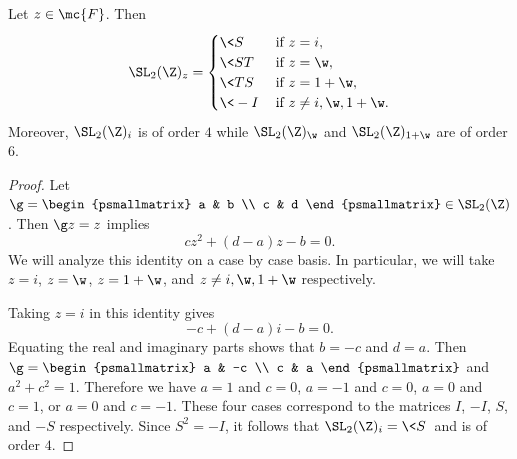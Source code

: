 \documentclass[12pt]{article}
\begin{document}
      \begin{proposition}\label{prop:stabilizer_subgroup}
        Let \(z \in \mc{F}\). Then
        \[
          \SL_{2}(\Z)_{z} = \begin{cases} \<S\> & \text{if \(z = i\)}, \\ \<ST\> & \text{if \(z = \w\)}, \\ \<TS\> & \text{if \(z = 1+\w\)}, \\ \<-I\> & \text{if \(z \neq i,\w,1+\w\)}. \end{cases}
        \]
        Moreover, \(\SL_{2}(\Z)_{i}\) is of order \(4\) while \(\SL_{2}(\Z)_{\w}\) and \(\SL_{2}(\Z)_{1+\w}\) are of order \(6\).
      \end{proposition}
      \begin{proof}
        Let \(\g = \begin{psmallmatrix} a & b \\ c & d \end{psmallmatrix} \in \SL_{2}(\Z)\). Then \(\g z = z\) implies
        \[
          cz^{2}+(d-a)z-b = 0.
        \]
        We will analyze this identity on a case by case basis. In particular, we will take \(z = i\), \(z = \w\), \(z = 1+\w\), and \(z \neq i,\w,1+\w\) respectively.

        Taking \(z = i\) in this identity gives
        \[
          -c+(d-a)i-b = 0.
        \]
        Equating the real and imaginary parts shows that \(b = -c\) and \(d = a\). Then \(\g = \begin{psmallmatrix} a & -c \\ c & a \end{psmallmatrix}\) and \(a^{2}+c^{2} = 1\). Therefore we have \(a = 1\) and \(c = 0\), \(a = -1\) and \(c = 0\), \(a = 0\) and \(c = 1\), or \(a = 0\) and \(c = -1\). These four cases correspond to the matrices \(I\), \(-I\), \(S\), and \(-S\) respectively. Since \(S^{2} = -I\), it follows that \(\SL_{2}(\Z)_{i} = \<S\>\) and is of order \(4\).
        

\end{proof}
\end{document}
